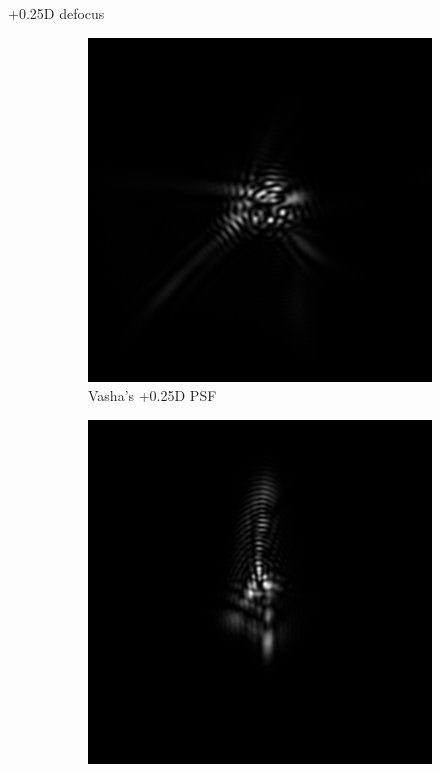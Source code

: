 \documentclass{article}
\begin{document}
+0.25D defocus
\begin{figure}[H]

\begin{subfigure}{.3\textwidth}
  \centering
  \includegraphics[width=1\linewidth]{Vasha_R_G_0530_2_500_zer_025_5_PSF.png}
  \caption{Vasha's +0.25D PSF}
  \label{fig:vasha025dpsf}
\end{subfigure}
\begin{subfigure}{.3\textwidth}
  \centering
  \includegraphics[width=1\linewidth]{Liz_R_G_0523_2_500_zer_025_5_PSF.png}

\end{subfigure}
\end{figure}
\end{document}
